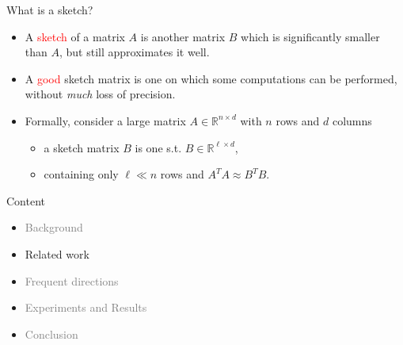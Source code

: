 \documentclass[first=dgreen,second=purple,logo=redque]{aaltoslides}
\begin{document}
\begin{frame}{What is a sketch?}
\begin{itemize}
  \item A \textcolor{red}{sketch} of a matrix $A$ is another matrix $B$ which is significantly
  \textcolor{dgreen}{smaller} than $A$, but still approximates it \textcolor{dgreen}{well}.
  \item A \textcolor{red}{good} sketch matrix is one on which some computations can
  be performed, \textcolor{dgreen}{without} \textit{much} loss of precision.
  \item Formally, consider a large matrix $A \in \mathbb{R}^{n\times d}$ with $n$ rows and $d$
columns
	\begin{itemize}
		\item a sketch matrix $B$ is one s.t. $B \in \mathbb{R}^{\ell \times d}$,
		\item containing only $\ell \ll n$ rows and $A^TA \approx B^TB$.
	\end{itemize}
\end{itemize}
\end{frame}




\begin{frame}{Content}
\begin{itemize}
\item \textcolor{gray}{Background}
\item Related work
\item \textcolor{gray}{Frequent directions}
\item \textcolor{gray}{Experiments and Results}
\item \textcolor{gray}{Conclusion}
\end{itemize}
\end{frame}
\end{document}
